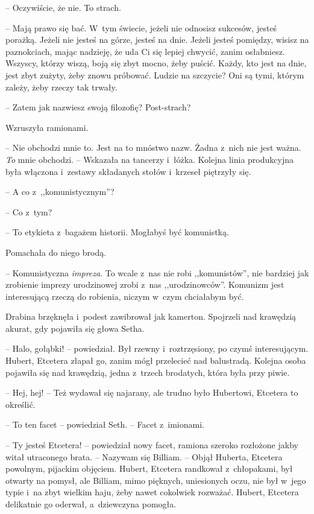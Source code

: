 \documentclass[oneside,polish,11pt,sfheadings]{mwbk}
\begin{document}
-- Oczywiście, że nie. To strach.

-- Mają prawo się bać. W~tym świecie, jeżeli nie odnosisz sukcesów,
jesteś porażką. Jeżeli nie jesteś na górze, jesteś na dnie. Jeżeli
jesteś pomiędzy, wisisz na paznokciach, mając nadzieję, że uda Ci się
lepiej chwycić, zanim osłabniesz. Wszyscy, którzy wiszą, boją się zbyt
mocno, żeby puścić. Każdy, kto jest na dnie, jest zbyt zużyty, żeby
znowu próbować. Ludzie na szczycie? Oni są tymi, którym zależy, żeby
rzeczy tak trwały.

-- Zatem jak nazwiesz swoją filozofię? Post-strach?

Wzruszyła ramionami. 

-- Nie obchodzi mnie to. Jest na to mnóstwo nazw.
Żadna z~nich nie jest ważna. \textit{To} mnie obchodzi. -- Wskazała na
tancerzy i~łóżka. Kolejna linia produkcyjna była włączona i~zestawy
składanych stołów i~krzeseł piętrzyły się.

-- A co z~,,komunistycznym''?

-- Co z~tym?

-- To etykieta z~bagażem historii. Mogłabyś być komunistką.

Pomachała do niego brodą. 

-- Komunistyczna \textit{impreza}. To wcale z~nas
nie robi ,,komunistów'', nie bardziej jak zrobienie imprezy urodzinowej
zrobi z~nas ,,urodzinowców''. Komunizm jest interesującą rzeczą do
robienia, niczym w~czym chciałabym być.

Drabina brzęknęła i~podest zawibrował jak kamerton. Spojrzeli nad
krawędzią akurat, gdy pojawiła się głowa Setha. 

-- Halo, gołąbki! -- powiedział. Był rzewny i~roztrzęsiony, po czymś interesującym. Hubert,
Etcetera złapał go, zanim mógł przelecieć nad balustradą. Kolejna osoba
pojawiła się nad krawędzią, jedna z~trzech brodatych, która była przy
piwie.

-- Hej, hej! -- Też wydawał się najarany, ale trudno było Hubertowi,
Etcetera to określić.

-- To ten facet -- powiedział Seth. -- Facet z~imionami.

-- Ty jesteś Etcetera! -- powiedział nowy facet, ramiona szeroko rozłożone
jakby witał utraconego brata. -- Nazywam się Billiam. -- Objął Huberta,
Etcetera powolnym, pijackim objęciem. Hubert, Etcetera randkował z~chłopakami, był otwarty na pomysł, ale Billiam, mimo pięknych,
uniesionych oczu, nie był w~jego typie i~na zbyt wielkim haju, żeby
nawet cokolwiek rozważać. Hubert, Etcetera delikatnie go oderwał, a~dziewczyna pomogła.
\end{document}
